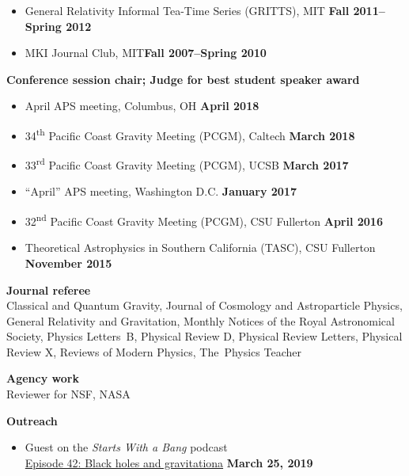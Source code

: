 \documentclass[margin,line]{res}
\begin{document}
\begin{resume}
\begin{itemize}
  {\bf Fall 2015--Spring 2018}
\item[] General Relativity Informal Tea-Time Series (GRITTS), MIT\hfill
  {\bf Fall 2011--Spring 2012}
\item[] MKI Journal Club, MIT\hfill {\bf Fall 2007--Spring 2010}
\end{itemize}
{\bf Conference session chair; Judge for best student speaker award}
\vspace*{.05in}
\begin{itemize}
\item[]
April APS meeting, Columbus, OH
\hfill {\bf April 2018}
\item[]
34\textsuperscript{th} Pacific Coast Gravity Meeting (PCGM),
Caltech
\hfill {\bf March 2018}
\item[]
33\textsuperscript{rd} Pacific Coast Gravity Meeting (PCGM),
UCSB
\hfill {\bf March 2017}
\item[]
``April'' APS meeting, Washington D.C.
\hfill {\bf January 2017}
\item[]
32\textsuperscript{nd} Pacific Coast Gravity Meeting (PCGM),
CSU Fullerton
\hfill {\bf April 2016}
\item[]
Theoretical Astrophysics in Southern California (TASC),
CSU Fullerton
\hfill {\bf November 2015}
\end{itemize}

{\bf Journal referee}
\vspace*{.05in}\\
\hspace*{1em}
Classical and Quantum Gravity,
Journal of Cosmology and Astroparticle Physics,
General Relativity and Gravitation,
Monthly Notices of the Royal Astronomical Society,
Physics Letters~B,
Physical Review D,
Physical Review Letters,
Physical Review X,
Reviews of Modern Physics,
The~Physics Teacher

{\bf Agency work}
\vspace*{.05in}\\
\hspace*{1em}
Reviewer for NSF, NASA

{\bf Outreach}
\vspace*{.05in}
\begin{itemize}
\item[] Guest on the {\it Starts With a Bang} podcast \\
\hspace*{1em}
\href{https://soundcloud.com/ethan-siegel-172073460/starts-with-a-bang-42-black-holes-and-gravitation}{Episode 42: Black holes and gravitationa}
\hfill
{\bf March 25, 2019} \\


\end{itemize}
\end{resume}
\end{document}
